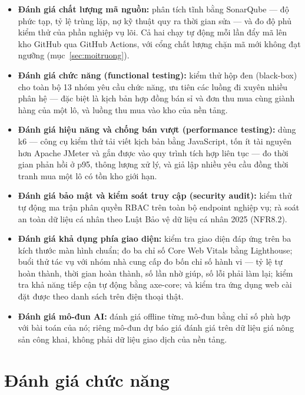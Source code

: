 \begin{itemize}
    \item \textbf{Đánh giá chất lượng mã nguồn:} phân tích tĩnh bằng SonarQube --- độ phức tạp, tỷ lệ trùng lặp, nợ kỹ thuật quy ra thời gian sửa --- và đo độ phủ kiểm thử của phần nghiệp vụ lõi. Cả hai chạy tự động mỗi lần đẩy mã lên kho GitHub qua GitHub Actions, với cổng chất lượng chặn mã mới không đạt ngưỡng (mục~\ref{sec:moitruong}).
    \item \textbf{Đánh giá chức năng (functional testing):} kiểm thử hộp đen (black-box) cho toàn bộ 13 nhóm yêu cầu chức năng, ưu tiên các luồng đi xuyên nhiều phân hệ --- đặc biệt là kịch bản hợp đồng bán sỉ và đơn thu mua cùng giành hàng của một lô, và luồng thu mua vào kho của nền tảng.
    \item \textbf{Đánh giá hiệu năng và chống bán vượt (performance testing):} dùng k6 --- công cụ kiểm thử tải viết kịch bản bằng JavaScript, tốn ít tài nguyên hơn Apache JMeter và gắn được vào quy trình tích hợp liên tục --- đo thời gian phản hồi ở p95, thông lượng xử lý, và giả lập nhiều yêu cầu đồng thời tranh mua một lô có tồn kho giới hạn.
    \item \textbf{Đánh giá bảo mật và kiểm soát truy cập (security audit):} kiểm thử tự động ma trận phân quyền RBAC trên toàn bộ endpoint nghiệp vụ; rà soát an toàn dữ liệu cá nhân theo Luật Bảo vệ dữ liệu cá nhân 2025 (NFR8.2).
    \item \textbf{Đánh giá khả dụng phía giao diện:} kiểm tra giao diện đáp ứng trên ba kích thước màn hình chuẩn; đo ba chỉ số Core Web Vitals bằng Lighthouse; buổi thử tác vụ với nhóm nhà cung cấp đo bốn chỉ số hành vi --- tỷ lệ tự hoàn thành, thời gian hoàn thành, số lần nhờ giúp, số lỗi phải làm lại; kiểm tra khả năng tiếp cận tự động bằng axe-core; và kiểm tra ứng dụng web cài đặt được theo danh sách trên điện thoại thật.
    \item \textbf{Đánh giá mô-đun AI:} đánh giá offline từng mô-đun bằng chỉ số phù hợp với bài toán của nó; riêng mô-đun dự báo giá đánh giá trên dữ liệu giá nông sản công khai, không phải dữ liệu giao dịch của nền tảng.
\end{itemize}


\section{Đánh giá chức năng}
\label{sec:danhgiachucnang}

